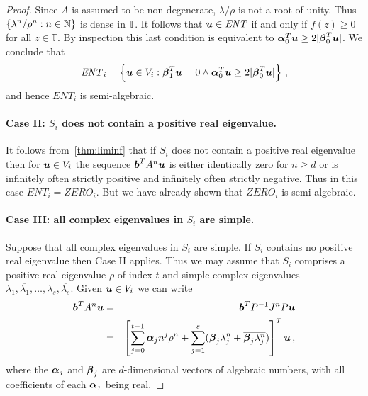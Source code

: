 \begin{proof}
Since $A$ is assumed to be non-degenerate, $\lambda/\rho$ is not a
root of unity.  Thus $\{\lambda^n/\rho^n:n\in\mathbb{N}\}$ is dense in
$\mathbb{T}$.  It follows that $\boldsymbol{u}\in\mathit{ENT}$ if and
only if $f(z)\geq 0$ for all $z\in\mathbb{T}$.  By inspection this
last condition is equivalent to $\boldsymbol{\alpha}_0^T\boldsymbol{u}
\geq 2|\boldsymbol{\beta}_0^T\boldsymbol{u}|$.
We conclude that
\[ \mathit{ENT}_i = \left\{ \boldsymbol{u}\in V_i :
\boldsymbol{\beta}_1^T\boldsymbol{u}=0 \wedge
\boldsymbol{\alpha}_0^T\boldsymbol{u} \geq 2|\boldsymbol{\beta}_0^T\boldsymbol{u}| \right\} \, ,\]
and hence $\mathit{ENT}_i$ is semi-algebraic.

\paragraph{Case II: $S_i$ does not contain a positive real eigenvalue.}
It follows from~\cref{thm:liminf} that if $S_i$ does not contain a
positive real eigenvalue then for $\boldsymbol{u}\in V_i$ the sequence
$\boldsymbol{b}^TA^n\boldsymbol{u}$ is either identically zero for $n\geq
d$ or is infinitely often strictly positive and infinitely often
strictly negative.  Thus in this case
$\mathit{ENT}_i=\mathit{ZERO}_i$.  But we have already shown that
$\mathit{ZERO}_i$ is semi-algebraic.


\paragraph{Case III: all complex eigenvalues in $S_i$ are simple.}
Suppose that all complex eigenvalues in $S_i$ are simple.  If $S_i$
contains no positive real eigenvalue then Case II applies.  Thus we
may assume that $S_i$ comprises a positive real eigenvalue $\rho$ of
index $t$ and simple complex eigenvalues
$\lambda_1,\overline{\lambda_1},\ldots,\lambda_s,\overline{\lambda_s}$.
Given $\boldsymbol{u}\in V_i$ we can write
\begin{eqnarray}
\myvector{b}^TA^n\myvector{u} &=& \myvector{b}^TP^{-1}J^nP\myvector{u}
\notag\\
&=& \left[\sum_{j=0}^{t-1} \myvector{\alpha}_j n^j \rho^n + \sum_{j=1}^s
(\myvector{\beta}_j \lambda_j^n + \overline{\myvector{\beta}_j \lambda^n_j})
\right]^T\myvector{u} \, ,
\label{eq:exp-poly}
\end{eqnarray}
where the $\boldsymbol{\alpha}_j$ and $\boldsymbol{\beta}_j$ are
$d$-dimensional vectors of algebraic numbers, with all coefficients of
each $\boldsymbol{\alpha}_j$ being real.


\end{proof}

